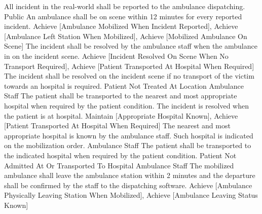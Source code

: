 	 {All incident in the real-world shall be reported to the ambulance dispatching.}
	 {Public}
\stopkaosspec
\startkaosspec
	 {An ambulance shall be on scene within 12 minutes for every reported incident.}
	 {Achieve [Ambulance Mobilized When Incident Reported], Achieve [Ambulance Left Station When Mobilized], Achieve [Mobilized Ambulance On Scene]}
\stopkaosspec
\startkaosspec
	 {The incident shall be resolved by the ambulance staff when the ambulance in on the incident scene.}
	 {Achieve [Incident Resolved On Scene When No Transport Required], Achieve [Patient Transported At Hospital When Required]}
\stopkaosspec
\startkaosspec
	 {The incident shall be resolved on the incident scene if no transport of the victim towards an hospital is required.}
	 {Patient Not Treated At Location}
	 {Ambulance Staff}
\stopkaosspec
\startkaosspec
	 {The patient shall be transported to the nearest and most appropriate hospital when required by the patient condition. The incident is resolved when the patient is at hospital.}
	 {Maintain [Appropriate Hospital Known], Achieve [Patient Transported At Hospital When Required]}
\stopkaosspec
\startkaosspec
	 {The nearest and most appropriate hospital is known by the ambulance staff. Such hospital is indicated on the mobilization order.}
	 {Ambulance Staff}
\stopkaosspec
\startkaosspec
	 {The patient shall be transported to the indicated hospital when required by the patient condition.}
	 {Patient Not Admitted At Or Transported To Hospital}
	 {Ambulance Staff}
\stopkaosspec
\startkaosspec
	 {The mobilized ambulance shall leave the ambulance station within 2 minutes and the departure shall be confirmed by the staff to the dispatching software.}
	 {Achieve [Ambulance Physically Leaving Station When Mobilized], Achieve [Ambulance Leaving Status Known]}
